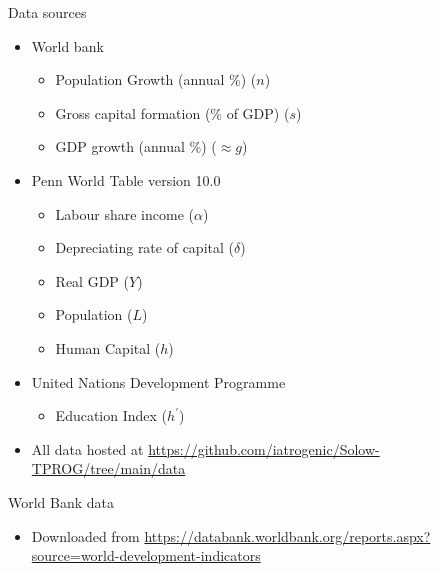 \documentclass{beamer}
\begin{document}


\begin{frame}{Data sources}
	\begin{itemize}
		\item World bank \begin{itemize}
			\item Population Growth (annual \%) ($n$)
			\item Gross capital formation (\% of GDP) ($s$)
			\item GDP growth (annual \%) ($\approx g$)
		\end{itemize}
	\end{itemize}

	\begin{itemize}
		\item Penn World Table version 10.0
		\begin{itemize}
			\item Labour share income ($\alpha$)
			\item Depreciating rate of capital ($\delta$)
			\item Real GDP ($Y$)
			\item Population ($L$)
			\item Human Capital ($h$)
		\end{itemize}
	
		\item United Nations Development Programme
   	\begin{itemize}
		\item Education Index ($h^\prime$)
	\end{itemize}
\item All data hosted at \url{https://github.com/iatrogenic/Solow-TPROG/tree/main/data}
\end{itemize}
\end{frame}

\begin{frame}{World Bank data}
	\begin{itemize}
		\item Downloaded from \url{https://databank.worldbank.org/reports.aspx?source=world-development-indicators}
	\end{itemize}
\end{frame}
\end{document}
